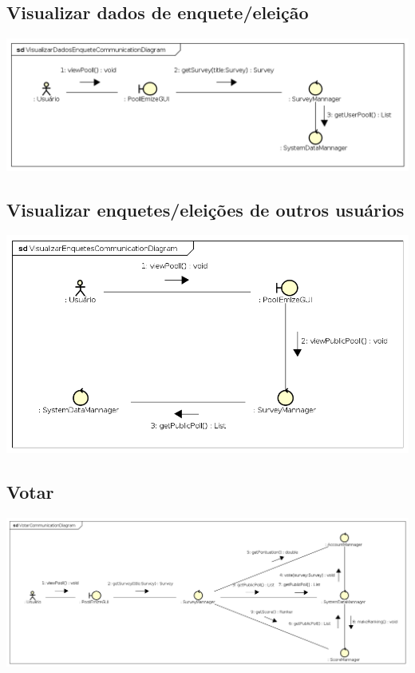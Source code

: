 \documentclass[a4paper,12pt]{report}
\begin{document}
\subsection*{Visualizar dados de enquete/eleição}
\markright{}
\includegraphics[width=14.3cm]{communication_diagrams/VisualizarDadosEnqueteCommunicationDiagram.png}

\subsection*{Visualizar enquetes/eleições de outros usuários}
\markright{}
\includegraphics[width=14.3cm]{communication_diagrams/VisualizarEnquetesCommunicationDiagram.png}

\subsection*{Votar}
\markright{}
\includegraphics[width=14.3cm]{communication_diagrams/VotarCommunicationDiagram.png}
\end{document}
